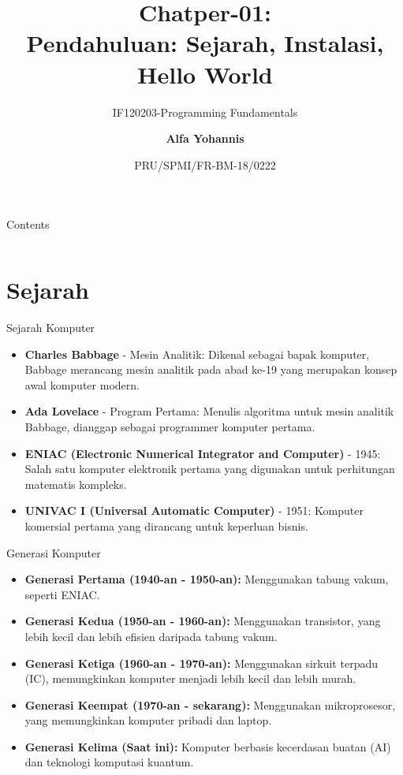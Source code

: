\documentclass[aspectratio=169, table]{beamer}
\subtitle{IF120203-Programming Fundamentals}
\title{Chatper-01:\\\LARGE{Pendahuluan: Sejarah, Instalasi,\\Hello World}}
\date[Serial]{\scriptsize {PRU/SPMI/FR-BM-18/0222}}
\author[Pradita]{\small{\textbf{Alfa Yohannis}}}
\begin{document}
\frame{\titlepage}

\begin{frame}[fragile]{Contents}
\vspace{15pt}
\begin{columns}[t]
\begin{column}{.5\textwidth}
\tableofcontents[sections={1-4}]
\end{column}
\begin{column}{.5\textwidth}
\tableofcontents[sections={5-9}]
\end{column}
\end{columns}
\end{frame}

\section{Sejarah}
\begin{frame}{Sejarah Komputer}
	\begin{itemize}
		\item \textbf{Charles Babbage} - Mesin Analitik: Dikenal sebagai bapak komputer, Babbage merancang mesin analitik pada abad ke-19 yang merupakan konsep awal komputer modern.
		\item \textbf{Ada Lovelace} - Program Pertama: Menulis algoritma untuk mesin analitik Babbage, dianggap sebagai programmer komputer pertama.
		\item \textbf{ENIAC (Electronic Numerical Integrator and Computer)} - 1945: Salah satu komputer elektronik pertama yang digunakan untuk perhitungan matematis kompleks.
		\item \textbf{UNIVAC I (Universal Automatic Computer)} - 1951: Komputer komersial pertama yang dirancang untuk keperluan bisnis.
	\end{itemize}
\end{frame}

\begin{frame}{Generasi Komputer}
		\begin{itemize}
			\item \textbf{Generasi Pertama (1940-an - 1950-an):} Menggunakan tabung vakum, seperti ENIAC.
			\item \textbf{Generasi Kedua (1950-an - 1960-an):} Menggunakan transistor, yang lebih kecil dan lebih efisien daripada tabung vakum.
			\item \textbf{Generasi Ketiga (1960-an - 1970-an):} Menggunakan sirkuit terpadu (IC), memungkinkan komputer menjadi lebih kecil dan lebih murah.
			\item \textbf{Generasi Keempat (1970-an - sekarang):} Menggunakan mikroprosesor, yang memungkinkan komputer pribadi dan laptop.
			\item \textbf{Generasi Kelima (Saat ini):} Komputer berbasis kecerdasan buatan (AI) dan teknologi komputasi kuantum.
		\end{itemize}
\end{frame}
\end{document}
